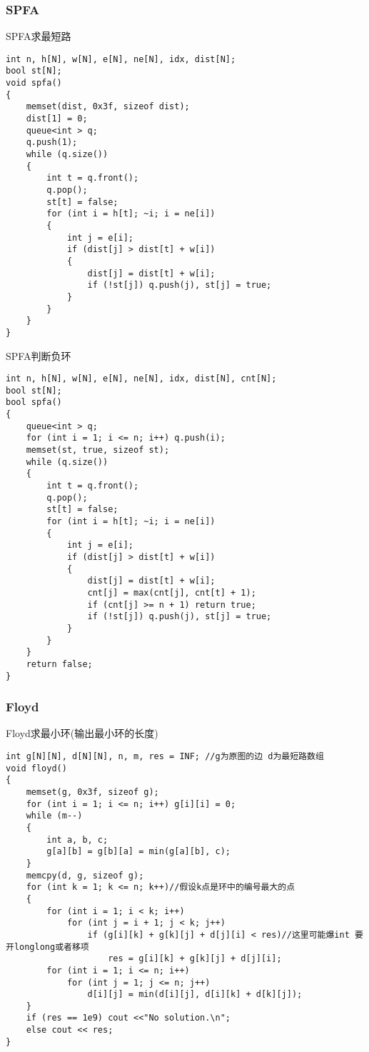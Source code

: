 \documentclass[a4paper, fontset=none]{ctexart}
\begin{document}
\subsubsection{SPFA}

SPFA求最短路

\begin{verbatim}
int n, h[N], w[N], e[N], ne[N], idx, dist[N];
bool st[N];
void spfa()
{
    memset(dist, 0x3f, sizeof dist);
    dist[1] = 0;
    queue<int > q;
    q.push(1);
    while (q.size())
    {
        int t = q.front();
        q.pop();
        st[t] = false;
        for (int i = h[t]; ~i; i = ne[i])
        {
            int j = e[i];
            if (dist[j] > dist[t] + w[i])
            {
                dist[j] = dist[t] + w[i];
                if (!st[j]) q.push(j), st[j] = true;
            }
        }
    }
}
\end{verbatim}

SPFA判断负环

\begin{verbatim}
int n, h[N], w[N], e[N], ne[N], idx, dist[N], cnt[N];
bool st[N];
bool spfa()
{
    queue<int > q;
    for (int i = 1; i <= n; i++) q.push(i);
    memset(st, true, sizeof st);
    while (q.size())
    {
        int t = q.front();
        q.pop();
        st[t] = false;
        for (int i = h[t]; ~i; i = ne[i])
        {
            int j = e[i];
            if (dist[j] > dist[t] + w[i])
            {
                dist[j] = dist[t] + w[i];
                cnt[j] = max(cnt[j], cnt[t] + 1);
                if (cnt[j] >= n + 1) return true;
                if (!st[j]) q.push(j), st[j] = true;
            }
        }
    }
    return false;
}
\end{verbatim}
\subsubsection{Floyd}

Floyd求最小环(输出最小环的长度)

\begin{verbatim}
int g[N][N], d[N][N], n, m, res = INF; //g为原图的边 d为最短路数组
void floyd()
{
    memset(g, 0x3f, sizeof g);
    for (int i = 1; i <= n; i++) g[i][i] = 0;
    while (m--)
    {
        int a, b, c;
        g[a][b] = g[b][a] = min(g[a][b], c);
    }
    memcpy(d, g, sizeof g);
    for (int k = 1; k <= n; k++)//假设k点是环中的编号最大的点
    {
        for (int i = 1; i < k; i++)
            for (int j = i + 1; j < k; j++)
                if (g[i][k] + g[k][j] + d[j][i] < res)//这里可能爆int 要开longlong或者移项
                    res = g[i][k] + g[k][j] + d[j][i];
        for (int i = 1; i <= n; i++)
            for (int j = 1; j <= n; j++)
                d[i][j] = min(d[i][j], d[i][k] + d[k][j]);
    }
    if (res == 1e9) cout <<"No solution.\n";
    else cout << res;
}
\end{verbatim}
\end{document}
